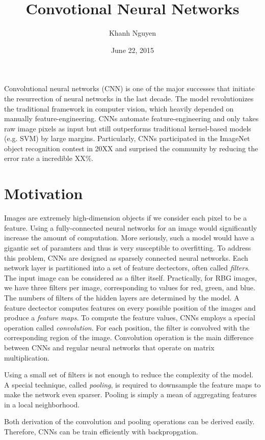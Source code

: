 \documentclass[11pt,letterpaper]{article}
\title{
  Convotional Neural Networks
}
\author{
	Khanh Nguyen
}
\date{June 22, 2015}
\begin{document}
\maketitle

Convolutional neural networks (CNN) is one of the major successes that initiate the resurrection of neural networks in the last decade. The model revolutionizes the traditional framework in computer vision, which heavily depended on manually feature-engineering. CNNs automate feature-engineering and only takes raw image pixels as input but still outperforms traditional kernel-based models (e.g. SVM) by large margins. Particularly, CNNs participated in the ImageNet object recognition contest in 20XX and surprised the community by reducing the error rate a incredible XX\%. 

\section{Motivation}

Images are extremely high-dimension objects if we consider each pixel to be a feature. Using a fully-connected neural networks for an image would significantly increase the amount of computation. More seriously, such a model would have a gigantic set of paramters and thus is very susceptible to overfitting. To address this problem, CNNs are designed as sparsely connected neural networks. Each network layer is partitioned into a set of feature dectectors, often called \emph{filters}. The input image can be considered as a filter itself. Practically, for RBG images, we have three filters per image, corresponding to values for red, green, and blue. The numbers of filters of the hidden layers are determined by the model. A feature dectector computes features on every possible position of the images and produce a \emph{feature maps}. To compute the feature values, CNNs employs a special operation called \emph{convolution}. For each position, the filter is convolved with the corresponding region of the image. Convolution operation is the main difference between CNNs and regular neural networks that operate on matrix multiplication. 

Using a small set of filters is not enough to reduce the complexity of the model. A special technique, called \emph{pooling}, is required to downsample the feature maps to make the network even sparser. Pooling is simply a mean of aggregating features in a local neighborhood. 

Both derivation of the convolution and pooling operations can be derived easily. Therefore, CNNs can be train efficiently with backpropgation. 
\end{document}
